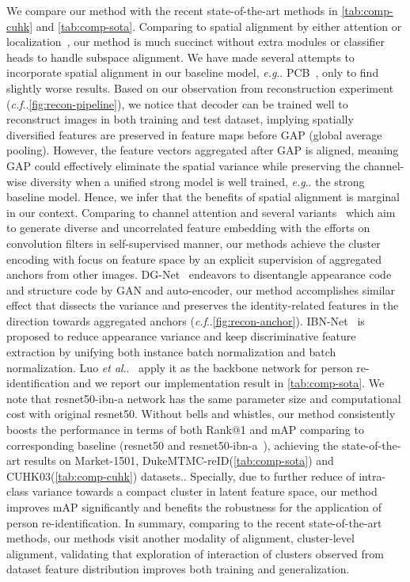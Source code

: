 \documentclass[runningheads]{llncs}
\makeatletter
\DeclareRobustCommand\onedot{\futurelet\@let@token\@onedot}
\def\@onedot{\ifx\@let@token.\else.\null\fi\xspace}
\def\eg{\emph{e.g}\onedot} \def\Eg{\emph{E.g}\onedot}
\def\cf{\emph{c.f}\onedot} \def\Cf{\emph{C.f}\onedot}
\def\etal{\emph{et al}\onedot}
\makeatother
\begin{document}
We compare our method with the recent state-of-the-art methods in \cref{tab:comp-cuhk} and \cref{tab:comp-sota}.
Comparing to spatial alignment by either attention or localization~\cite{sun-pcb,tay-aanet,hou-interaction,yang-cam,guo-part,dai-batch}, our method is much succinct without extra modules or classifier heads to handle subspace alignment.
We have made several attempts to incorporate spatial alignment in our baseline model, \eg PCB~\cite{sun-pcb}, only to find slightly worse results.
Based on our observation from reconstruction experiment (\cf \cref{fig:recon-pipeline}), we notice that decoder can be trained well to reconstruct images in both training and test dataset, implying spatially diversified features are preserved in feature maps before GAP (global average pooling).
However, the feature vectors aggregated after GAP is aligned, meaning GAP could effectively eliminate the spatial variance while preserving the channel-wise diversity when a unified strong model is well trained, \eg the strong baseline model\cite{luo-bnneck}.
Hence, we infer that the benefits of spatial alignment is marginal in our context.
Comparing to channel attention and several variants~\cite{zhou-omni,chen-mixedattention,chen-abd} which aim to generate diverse and uncorrelated feature embedding with the efforts on convolution filters in self-supervised manner, our methods achieve the cluster encoding with focus on feature space by an explicit supervision of aggregated anchors from other images.
DG-Net~\cite{zheng-joint} endeavors to disentangle appearance code and structure code by GAN and auto-encoder, our method accomplishes similar effect that dissects the variance and preserves the identity-related features in the direction towards aggregated anchors (\cf \cref{fig:recon-anchor}).
IBN-Net~\cite{Pan-ibnnet} is proposed to reduce appearance variance and keep discriminative feature extraction by unifying both instance batch normalization and batch normalization.
Luo \etal~\cite{luo-bnneck} apply it as the backbone network for person re-identification and we report our implementation result in \cref{tab:comp-sota}.
We note that resnet50-ibn-a network has the same parameter size and computational cost with original resnet50.
Without bells and whistles, our method consistently boosts the performance in terms of both Rank@1 and mAP comparing to corresponding baseline (resnet50 and resnet50-ibn-a~\cite{luo-bnneck}), achieving the state-of-the-art results on Market-1501, DukeMTMC-reID(\cref{tab:comp-sota}) and CUHK03(\cref{tab:comp-cuhk}) datasets..
Specially, due to further reduce of intra-class variance towards a compact cluster in latent feature space, our method improves mAP significantly and benefits the robustness for the application of person re-identification.
In summary, comparing to the recent state-of-the-art methods, our methods visit another modality of alignment, cluster-level alignment, validating that exploration of interaction of clusters observed from dataset feature distribution improves both training and generalization.
\end{document}
